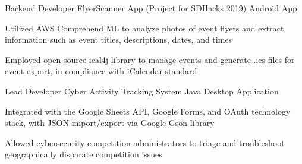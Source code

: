 

\begin{cventries}

  \cventry
    {Backend Developer} %
    {FlyerScanner App (Project for SDHacks 2019)} %
    {Android App} %
    {} %
    {
      \begin{cvitems} %
        \item {Utilized AWS Comprehend ML to analyze photos of event flyers and extract information such as event titles, descriptions, dates, and times}
        \item {Employed open source ical4j library to manage events and generate .ics files for event export, in compliance with iCalendar standard}
      \end{cvitems}
    }
    
  \cventry
    {Lead Developer} %
    {Cyber Activity Tracking System} %
    {Java Desktop Application} %
    {} %
    {
      \begin{cvitems} %
        \item {Integrated with the Google Sheets API, Google Forms, and OAuth technology stack, with JSON import/export via Google Gson library}
        \item {Allowed cybersecurity competition administrators to triage and troubleshoot geographically disparate competition issues}
      \end{cvitems}
    }
    
\end{cventries}